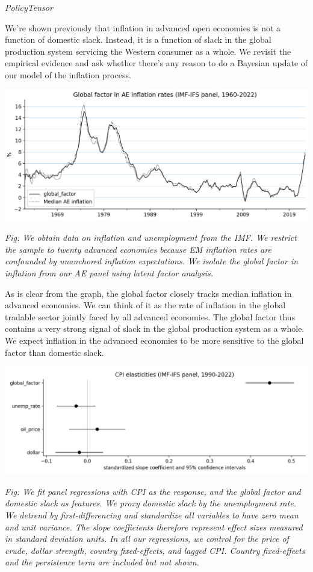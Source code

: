 \documentclass[
]{book}
\begin{document}
\emph{PolicyTensor}

We're shown previously that inflation in advanced open economies is not a function of domestic slack. Instead, it is a function of slack in the global production system servicing the Western consumer as a whole. We revisit the empirical evidence and ask whether there's any reason to do a Bayesian update of our model of the inflation process.

\includegraphics{fig/global_inflation.jpg}

\emph{Fig: We obtain data on inflation and unemployment from the IMF. We restrict the sample to twenty advanced economies because EM inflation rates are confounded by unanchored inflation expectations. We isolate the global factor in inflation from our AE panel using latent factor analysis.}

As is clear from the graph, the global factor closely tracks median inflation in advanced economies. We can think of it as the rate of inflation in the global tradable sector jointly faced by all advanced economies. The global factor thus contains a very strong signal of slack in the global production system as a whole. We expect inflation in the advanced economies to be more sensitive to the global factor than domestic slack.

\includegraphics{fig/cpi_elasticities.jpg}

\emph{Fig: We fit panel regressions with CPI as the response, and the global factor and domestic slack as features. We proxy domestic slack by the unemployment rate. We detrend by first-differencing and standardize all variables to have zero mean and unit variance. The slope coefficients therefore represent effect sizes measured in standard deviation units. In all our regressions, we control for the price of crude, dollar strength, country fixed-effects, and lagged CPI. Country fixed-effects and the persistence term are included but not shown.}
\end{document}
